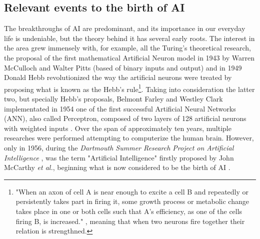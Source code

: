 \documentclass[a4paper, 12pt]{report}
\begin{document}

\subsection{Relevant events to the birth of AI}
\par The breakthroughs of AI are predominant, and its importance in our everyday life is undeniable, but the theory behind it has several early roots. The interest in the area grew immensely with, for example, all the Turing's theoretical research, the proposal of the first mathematical Artificial Neuron model in 1943 by Warren McCulloch and Walter Pitts (based of binary inputs and output) \autocite{mccullochLOGICALCALCULUSIDEAS} and in 1949 Donald Hebb revolutionized the way the artificial neurons were treated by proposing what is known as the Hebb's rule\footnote{"When an axon of cell A is near enough to excite a cell B and repeatedly or persistently takes part in firing it, some growth process or metabolic change takes place in one or both cells such that A’s efficiency, as one of the cells firing B, is increased." \autocite{hebbOrganizationBehaviorNeuropsychological1949}, meaning that when two neurons fire together their relation is strengthned.}. Taking into consideration the latter two, but specially Hebb's proposals, Belmont Farley and Westley Clark implementated in 1954 one of the first successful Artificial Neural Networks (ANN), also called Perceptron, composed of two layers of 128 artificial neurons with weighted inputs \autocite{farleySimulationSelforganizingSystems1954}. Over the span of approximately ten years, multiple researches were performed attempting to computerize the human brain. However, only in 1956, during the \textit{Dartmouth Summer Research Project on Artificial Intelligence} \autocite{mccarthyPROPOSALDARTMOUTHSUMMER}, was the term "Artificial Intelligence" firstly proposed by John McCarthy \textit{et al.}, beginning what is now considered to be the birth of AI \autocite{zhangStudyArtificialIntelligence2021}.  
\end{document}
